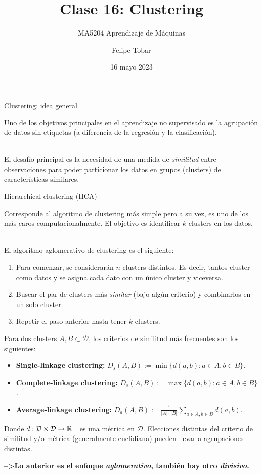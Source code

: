 \documentclass[handout, 9pt]{beamer}
\title{Clase 16: Clustering}
\subtitle{MA5204 Aprendizaje de Máquinas}
\date{16 mayo 2023}
\author{Felipe Tobar}
\institute{Iniciativa de Datos e Inteligencia Artificial\\Universidad de Chile}
\begin{document}
\begin{frame}
  \titlepage
\end{frame}

\begin{frame}{Clustering: idea general}
	
	Uno de los objetivos principales en el aprendizaje no supervisado es la agrupación de datos sin  etiquetas (a diferencia de la regresión y la clasificación).\\~\
	
	\pause
	El desafío principal es la necesidad de una medida de \emph{similitud} 	entre observaciones para poder particionar los datos en grupos (clusters) de características similares.
	
\end{frame}

\begin{frame}{Hierarchical clustering (HCA)}
	
	Corresponde al algoritmo de clustering más simple pero a su vez, es uno de los más caros computacionalmente. El objetivo es identificar $k$ clusters en los datos. \\~\ \pause

 El algoritmo aglomerativo de clustering es el siguiente:

\begin{enumerate}
	\item Para comenzar, se considerarán $n$ clusters distintos. Es decir, tantos cluster como datos y se asigna cada dato con un único cluster y viceversa.\pause
	\item Buscar el par de clusters más \emph{similar} (bajo algún criterio) y combinarlos en un solo cluster.\pause
	\item Repetir el paso anterior hasta tener $k$ clusters.
\end{enumerate}
\pause
Para dos clusters $A,B\subset\mathcal{D}$, los criterios de similitud más frecuentes son los siguientes:

\begin{itemize}
	\item \textbf{Single-linkage clustering:} $D_s(A,B):=\min\{d(a,b):a\in A, b\in B\}$.\pause
	\item \textbf{Complete-linkage clustering:} $D_s(A,B):=\max\{d(a,b):a\in A, b\in B\}$.\pause
	\item \textbf{Average-linkage clustering:} $D_a(A,B):=\frac{1}{|A|\cdot|B|}\sum_{a\in A, b\in B} d(a,b)$.\pause
\end{itemize}

Donde $d:\mathcal{D}\times \mathcal{D}\to \mathbb{R}_+$ es una métrica en $\mathcal{D}$. Elecciones distintas del criterio de similitud y/o métrica (generalmente euclidiana) pueden llevar a agrupaciones distintas.
	
\textbf{-->Lo anterior es el enfoque \emph{aglomerativo}, también hay otro \emph{divisivo}.}	
\end{frame}
\end{document}
